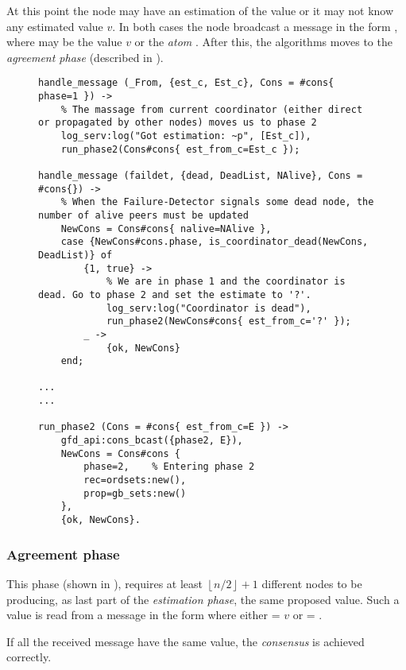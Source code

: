 At this point the node may have an estimation of the value or it may not
know any estimated value $v$. In both cases the node broadcast a message
in the form , where  may be the value $v$ or
the \emph{atom} . After this, the algorithms moves to the
\emph{agreement phase} (described in ).

\begin{figure}[hbt]
\begin{lstlisting}[caption={Estimation phase},
                   label={code:ConsEstimation}]
handle_message (_From, {est_c, Est_c}, Cons = #cons{ phase=1 }) ->
    % The massage from current coordinator (either direct or propagated by other nodes) moves us to phase 2
    log_serv:log("Got estimation: ~p", [Est_c]),
    run_phase2(Cons#cons{ est_from_c=Est_c });

handle_message (faildet, {dead, DeadList, NAlive}, Cons = #cons{}) ->
    % When the Failure-Detector signals some dead node, the number of alive peers must be updated
    NewCons = Cons#cons{ nalive=NAlive },
    case {NewCons#cons.phase, is_coordinator_dead(NewCons, DeadList)} of
        {1, true} ->
            % We are in phase 1 and the coordinator is dead. Go to phase 2 and set the estimate to '?'.
            log_serv:log("Coordinator is dead"),
            run_phase2(NewCons#cons{ est_from_c='?' });
        _ ->
            {ok, NewCons}
    end;

...
...

run_phase2 (Cons = #cons{ est_from_c=E }) ->
    gfd_api:cons_bcast({phase2, E}),
    NewCons = Cons#cons {
        phase=2,    % Entering phase 2
        rec=ordsets:new(),
        prop=gb_sets:new()
    },
    {ok, NewCons}.
\end{lstlisting}
\end{figure}

\subsubsection{Agreement phase} \label{subsub:ConsAgreement}

This phase (shown in ), requires at least
$\left\lfloor n/2 \right\rfloor + 1$ different nodes to be producing, as
last part of the \emph{estimation phase}, the same proposed value. Such a
value is read from a message in the form  where
either  = $v$ or  = .

If all the received message have the same value, the \emph{consensus} is
achieved correctly.

